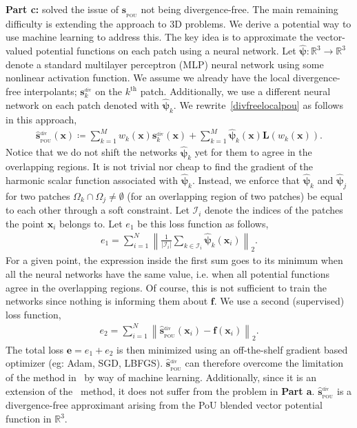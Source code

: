 \documentclass[12pt]{exam}
\def\R{\mathbb{R}}
\def\bx{\mathbf{x}}
\def\bs{\mathbf{s}}
\def\bspou{\mathbf{s}_{_{\text{POU}}}}
\def\bof{\mathbf{f}}
\def\bL{\mathbf{L}}
\def\nn{\hat{\boldsymbol{\psi}}}
\def\I{\mathcal{I}}
\begin{document}
\begin{questions}
{\bf Part c:} \citep{drake2021partition} solved the issue of $\bspou$ not being divergence-free. The main remaining difficulty is extending the approach to 3D problems. We derive a potential way to use machine learning to address this. The key idea is to approximate the vector-valued potential functions on each patch using a neural network. Let $\nn: \R^{3} \rightarrow \R^{3}$ denote a standard multilayer perceptron (MLP) neural network using some nonlinear activation function. We assume we already have the local divergence-free interpolants; $\bs_k^{_{\text{div}}}$ on the $k^{\text{th}}$ patch. Additionally, we use a different neural network on each patch denoted with $\nn_k$. We rewrite~\eqref{divfreelocalpou} as follows in this approach,
\begin{align}
\hat{\mathbf{s}}^{_{\text{div}}}_{_{\text{POU}}}(\bx) \coloneqq \sum\limits_{k=1}^{M} w_k(\bx) \bs_k^{_{\text{div}}}(\bx) + \sum\limits_{k=1}^{M} \nn_k(\bx) \bL(w_k(\bx)). \label{divfreelocalpou_nn}
\end{align}
Notice that we do not shift the networks $\nn_k$ yet for them to agree in the overlapping regions. It is not trivial nor cheap to find the gradient of the harmonic scalar function associated with $\nn_k$. Instead, we enforce that $\nn_k$ and $\nn_j$ for two patches $\Omega_k \cap \Omega_j \neq \emptyset$ (for an overlapping region of two patches) be equal to each other through a soft constraint. Let $\I_i$ denote the indices of the patches the point $\bx_i$ belongs to. Let $e_1$ be this loss function as follows,
\begin{align}
e_1 = \sum\limits_{i=1}^{N} \left\| \frac{1}{|\I_i|} \sum\limits_{k \in \I_i} \nn_k(\bx_i) \right\|_2.
\end{align}
For a given point, the expression inside the first sum goes to its minimum when all the neural networks have the same value, i.e. when all potential functions agree in the overlapping regions. Of course, this is not sufficient to train the networks since nothing is informing them about $\bof$. We use a second (supervised) loss function,
\begin{align}
e_2 = \sum\limits_{i=1}^{N} \left\| \hat{\mathbf{s}}^{_{\text{div}}}_{_{\text{POU}}}(\bx_i) - \bof(\bx_i) \right\|_2.
\end{align}
The total loss $\mathbf{e} = e_1 + e_2$ is then minimized using an off-the-shelf gradient based optimizer (eg: Adam, SGD, LBFGS). $\hat{\mathbf{s}}^{_{\text{div}}}_{_{\text{POU}}}$ can therefore overcome the limitation of the method in~\citep{drake2021partition} by way of machine learning. Additionally, since it is an extension of the~\citep{drake2021partition} method, it does not suffer from the problem in {\bf Part a}. $\hat{\mathbf{s}}^{_{\text{div}}}_{_{\text{POU}}}$ is a divergence-free approximant arising from the PoU blended vector potential function in $\R^3$.


\end{questions}
\end{document}
